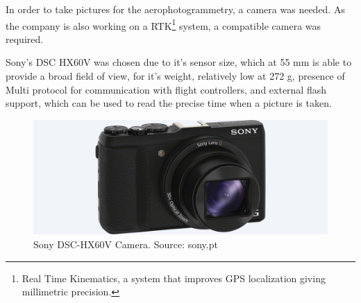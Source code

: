 In order to take pictures for the aerophotogrammetry, a camera was needed. As the company is also working on a RTK\footnote{Real Time Kinematics, a system that improves GPS localization giving millimetric precision.} system, a compatible camera was required.

Sony's DSC HX60V was chosen due to it's sensor size, which at 55 mm is able to provide a broad field of view, for it's weight, relatively low at 272 g, presence of Multi protocol for communication with flight controllers, and external flash support, which can be used to read the precise time when a picture is taken.

\begin{figure}[H]
\centering
  \includegraphics[width=0.8\linewidth]{figs/camera.jpg}
  \caption{Sony DSC-HX60V Camera. Source: sony.pt}
  \label{fig:camera}
\end{figure}


